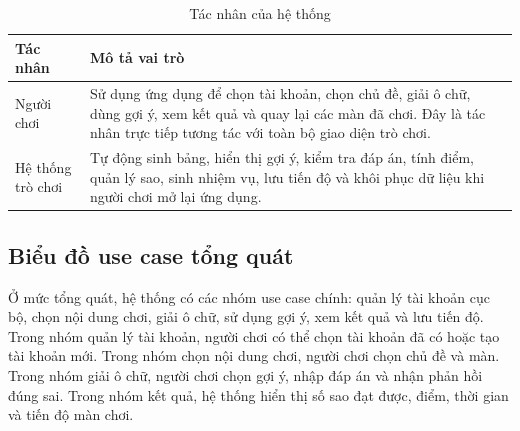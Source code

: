 \documentclass[../DoAn.tex]{subfiles}
\begin{document}
\begin{table}[H]
\centering
\begin{tabularx}{\textwidth}{|>{\RaggedRight\arraybackslash}p{3.2cm}|>{\RaggedRight\arraybackslash}X|}
\hline
\textbf{Tác nhân} & \textbf{Mô tả vai trò} \\ \hline
Người chơi & Sử dụng ứng dụng để chọn tài khoản, chọn chủ đề, giải ô chữ, dùng gợi ý, xem kết quả và quay lại các màn đã chơi. Đây là tác nhân trực tiếp tương tác với toàn bộ giao diện trò chơi. \\ \hline
Hệ thống trò chơi & Tự động sinh bảng, hiển thị gợi ý, kiểm tra đáp án, tính điểm, quản lý sao, sinh nhiệm vụ, lưu tiến độ và khôi phục dữ liệu khi người chơi mở lại ứng dụng. \\ \hline
\end{tabularx}
\caption{Tác nhân của hệ thống}
\label{table:actors}
\end{table}

\subsection{Biểu đồ use case tổng quát}
\label{subsection:2.2.1}
Ở mức tổng quát, hệ thống có các nhóm use case chính: quản lý tài khoản cục bộ, chọn nội dung chơi, giải ô chữ, sử dụng gợi ý, xem kết quả và lưu tiến độ. Trong nhóm quản lý tài khoản, người chơi có thể chọn tài khoản đã có hoặc tạo tài khoản mới. Trong nhóm chọn nội dung chơi, người chơi chọn chủ đề và màn. Trong nhóm giải ô chữ, người chơi chọn gợi ý, nhập đáp án và nhận phản hồi đúng sai. Trong nhóm kết quả, hệ thống hiển thị số sao đạt được, điểm, thời gian và tiến độ màn chơi.

\end{document}
